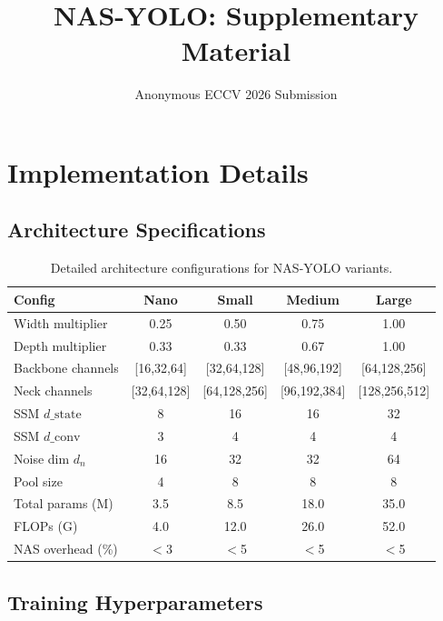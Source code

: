 \documentclass[review]{eccv2026}
\title{NAS-YOLO: Supplementary Material}
\author{Anonymous ECCV 2026 Submission}
\begin{document}
\maketitle

\appendix

\section{Implementation Details}
\label{sec:supp_impl}

\subsection{Architecture Specifications}

\begin{table}[h]
  \centering
  \caption{Detailed architecture configurations for NAS-YOLO variants.}
  \label{tab:supp_arch}
  \small
  \begin{tabular}{l|cccc}
    \toprule
    \textbf{Config} & \textbf{Nano} & \textbf{Small} & \textbf{Medium} & \textbf{Large} \\
    \midrule
    Width multiplier & 0.25 & 0.50 & 0.75 & 1.00 \\
    Depth multiplier & 0.33 & 0.33 & 0.67 & 1.00 \\
    Backbone channels & [16,32,64] & [32,64,128] & [48,96,192] & [64,128,256] \\
    Neck channels & [32,64,128] & [64,128,256] & [96,192,384] & [128,256,512] \\
    SSM $d\_\text{state}$ & 8 & 16 & 16 & 32 \\
    SSM $d\_\text{conv}$ & 3 & 4 & 4 & 4 \\
    Noise dim $d_n$ & 16 & 32 & 32 & 64 \\
    Pool size & 4 & 8 & 8 & 8 \\
    \midrule
    Total params (M) & 3.5 & 8.5 & 18.0 & 35.0 \\
    FLOPs (G) & 4.0 & 12.0 & 26.0 & 52.0 \\
    NAS overhead (\%) & $<$3 & $<$5 & $<$5 & $<$5 \\
    \bottomrule
  \end{tabular}
\end{table}

\subsection{Training Hyperparameters}
\end{document}
